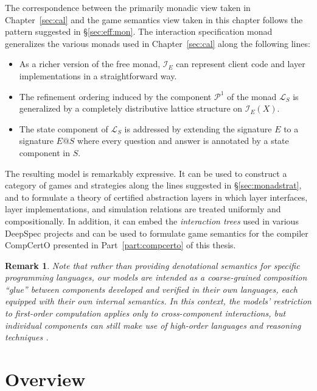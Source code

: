 \documentclass[11pt,oneside,draft]{book}
\newtheorem{remark}[theorem]{Remark}
\theoremstyle{definition}
\begin{document}
The correspondence
between the primarily monadic view taken in Chapter~\ref{sec:cal}
and the game semantics view taken in this chapter
follows the pattern suggested in \S\ref{sec:eff:mon}.
The interaction specification monad
generalizes the various monads used in Chapter~\ref{sec:cal}
along the following lines:
\begin{itemize}
  \item
    As a richer version of the free monad,
    $\mathcal{I}_E$ can represent
    client code and layer implementations
    in a straightforward way.
  \item
    The refinement ordering induced by
    the component $\mathcal{P}^1$ of the monad $\mathcal{L}_S$
    is generalized by a completely distributive lattice structure
    on $\mathcal{I}_E(X)$.
  \item
    The state component of $\mathcal{L}_S$
    is addressed by extending the signature $E$
    to a signature $E@S$ where
    every question and answer is annotated by
    a state component in $S$.
\end{itemize}
The resulting model is remarkably expressive.
It can be used to construct
a category of games and strategies along the lines suggested in
\S\ref{sec:monadstrat},
and to formulate a theory of certified abstraction
layers in which
layer interfaces, layer implementations, and simulation relations
are treated uniformly and compositionally.
In addition,
it can embed the \emph{interaction trees}
used in various DeepSpec projects \citep{itree}
and can be used to formulate game semantics
for the compiler CompCertO
presented in Part~\ref{part:compcerto} of this thesis.

\begin{remark}
Note that rather than providing
denotational semantics for specific programming
languages, our models are intended as a coarse-grained composition
``glue'' between components developed and verified in their own
languages, each equipped with their own internal semantics.
In this context,
the models' restriction to first-order computation
applies only to cross-component interactions,
but individual components can still make use of
high-order languages and reasoning techniques
\citep{hosl-fo}.
\end{remark}


\section{Overview} %
\end{document}
